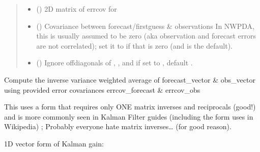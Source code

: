 \documentclass[letterpaper,10pt,english]{sphinxmanual}
\begin{document}
\begin{fulllineitems}
\begin{quote}
\begin{description}
\begin{itemize}
\item {}
\sphinxAtStartPar
{} () \textendash{} 2D matrix of errcov for 

\item {}
\sphinxAtStartPar
{} () \textendash{} Covariance between forecast/first\sphinxhyphen{}guess \& observations
In NWP\sphinxhyphen{}DA, this is usually assumed to be zero
(aka observation and forecast errors are not correlated);
set it to  if that is zero (and  is the default).

\item {}
\sphinxAtStartPar
{} () \textendash{} Ignore off\sphinxhyphen{}diagonals of , ,
and  if set to , default .

\end{itemize}

\end{description}\end{quote}

\begin{fulllineitems}
\label{\detokenize{kalman:glomar_gridding.autoregressive_kalman.KalmanOut.predict}}
\pysigstartsignatures
\pysiglinewithargsret
{}
{}
{}
\pysigstopsignatures
\sphinxAtStartPar
Compute the inverse variance weighted average of
forecast\_vector \& obs\_vector using provided error covariances
errcov\_forecast \& errcov\_obs

\sphinxAtStartPar
This uses a form that requires only ONE matrix inverses
and reciprocals (good!) and is more commonly seen in
Kalman Filter guides (including the form uses in Wikipedia)
;
Probably everyone hate matrix inverses… (for good reason).

\sphinxAtStartPar
1D vector form of Kalman gain:


\end{fulllineitems}
\end{fulllineitems}
\end{document}
